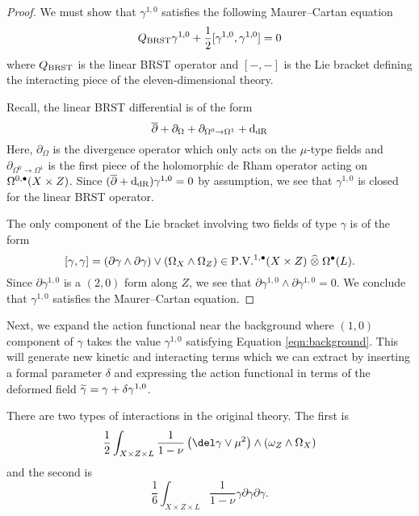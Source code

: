 \documentclass[11pt]{amsart}
\begin{document}
\begin{proof}
  We must show that $\gamma^{1,0}$ satisfies the following Maurer--Cartan equation
  \[
    Q_{\rm BRST} \gamma^{1,0} + \frac12 [\gamma^{1,0} ,\gamma^{1,0}] = 0
  \]
  where $Q_{\rm BRST}$ is the linear BRST operator and $[-,-]$ is the Lie bracket defining the interacting piece of the eleven-dimensional theory.

Recall, the linear BRST differential is of the form
  \[
    \dbar + \partial_{\Omega} + \partial_{\Omega^0 \to \Omega^1} + \d_{\rm dR}
  \]
  Here, $\partial_\Omega$ is the divergence operator which only acts on the $\mu$-type fields and $\partial_{\Omega^0 \to \Omega^1}$ is the first piece of the holomorphic de Rham operator acting on $\Omega^{0,\bu}(X \times Z)$.
  Since $(\dbar + \d_{\rm dR}) \gamma^{1,0} = 0$ by assumption, we see that $\gamma^{1,0}$ is closed for the linear BRST operator.

The only component of the Lie bracket involving two fields of type $\gamma$ is of the form
  \[
    [\gamma, \gamma] = (\partial \gamma \wedge \partial \gamma) \vee (\Omega_X \wedge \Omega_Z) \in \PV^{1,\bu}(X \times Z) \; \Hat{\otimes} \; \Omega^\bu(L) .
  \]
  Since $\partial \gamma^{1,0}$ is a $(2,0)$ form along $Z$, we see that $\partial \gamma^{1,0} \wedge \partial \gamma^{1,0} =0$.
  We conclude that $\gamma^{1,0}$ satisfies the Maurer--Cartan equation.
\end{proof}

Next, we expand the action functional near the background where $(1,0)$ component of $\gamma$ takes the value $\gamma^{1,0}$ satisfying Equation \eqref{eqn:background}.
This will generate new kinetic and interacting terms which we can extract by inserting a formal parameter $\delta$ and expressing the action functional in terms of the deformed field $\Tilde{\gamma} = \gamma + \delta \gamma^{1,0}$.

There are two types of interactions in the original theory.
The first is
\begin{equation}\label{eqn:int1}
  \frac12 \int_{X\times Z \times L} \frac{1}{1-\nu} \left(\del \gamma \vee \mu^2 \right) \wedge (\omega_Z \wedge \Omega_X)
\end{equation}
and the second is
\begin{equation} \label{eqn:int2}
  \frac16\int_{X \times Z \times L} \frac{1}{1-\nu} \gamma \partial \gamma \partial \gamma .
\end{equation}
\end{document}
